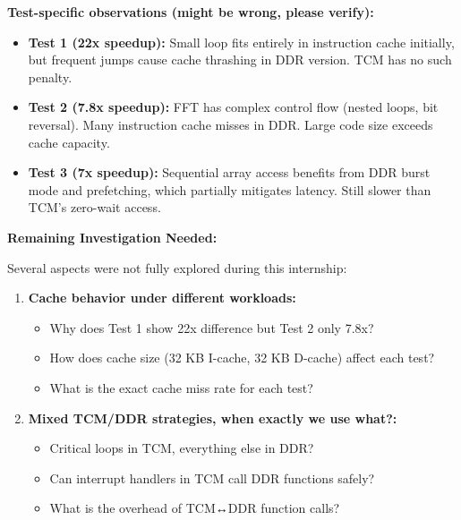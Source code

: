 \documentclass[12pt,a4paper]{report}
\begin{document}
\textbf{Test-specific observations (might be wrong, please verify):}

\begin{itemize}
    \item \textbf{Test 1 (22x speedup):} Small loop fits entirely in instruction cache initially, but frequent jumps cause cache thrashing in DDR version. TCM has no such penalty.
    
    \item \textbf{Test 2 (7.8x speedup):} FFT has complex control flow (nested loops, bit reversal). Many instruction cache misses in DDR. Large code size exceeds cache capacity.
    
    \item \textbf{Test 3 (7x speedup):} Sequential array access benefits from DDR burst mode and prefetching, which partially mitigates latency. Still slower than TCM's zero-wait access.
\end{itemize}

\begin{important}
\textbf{Remaining Investigation Needed:}

Several aspects were not fully explored during this internship:

\begin{enumerate}
    \item \textbf{Cache behavior under different workloads:}
    \begin{itemize}
        \item Why does Test 1 show 22x difference but Test 2 only 7.8x?
        \item How does cache size (32 KB I-cache, 32 KB D-cache) affect each test?
        \item What is the exact cache miss rate for each test?
    \end{itemize}

    
    
    \item \textbf{Mixed TCM/DDR strategies, when exactly we use what?:}
    \begin{itemize}
        \item Critical loops in TCM, everything else in DDR?
        \item Can interrupt handlers in TCM call DDR functions safely?
        \item What is the overhead of TCM↔DDR function calls?
    \end{itemize}
    
    
\end{enumerate}

\end{important}
\end{document}
